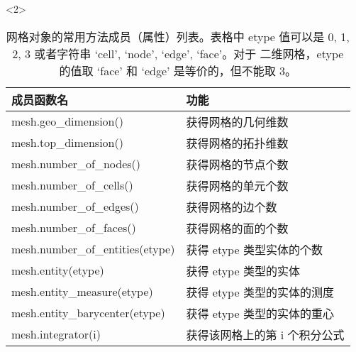 \documentclass{beamer}
\numberwithin{subsection}{section}
\begin{document}
\begin{frame}
\begin{onlyenv}<2>
    \begin{table}[H]
    \tiny
    \centering
    \begin{tabular}{|l|l|}\hline
        成员函数名 &	功能\\\hline
        mesh.geo\_dimension()&	获得网格的几何维数\\\hline
        mesh.top\_dimension()&	获得网格的拓扑维数\\\hline
        mesh.number\_of\_nodes()&	获得网格的节点个数\\\hline
        mesh.number\_of\_cells()&	获得网格的单元个数\\\hline
        mesh.number\_of\_edges()&	获得网格的边个数\\\hline
        mesh.number\_of\_faces()&	获得网格的面的个数\\\hline
        mesh.number\_of\_entities(etype)&	获得 etype 类型实体的个数\\\hline
        mesh.entity(etype)&	获得 etype 类型的实体\\\hline
        mesh.entity\_measure(etype)	& 获得 etype 类型的实体的测度\\\hline
        mesh.entity\_barycenter(etype)&	获得 etype 类型的实体的重心\\\hline
        mesh.integrator(i)&	获得该网格上的第 i 个积分公式\\\hline
    \end{tabular}
    \caption{网格对象的常用方法成员（属性）列表。表格中 etype 值可以是 0, 1, 2, 3 或者字符串 ‘cell’, ‘node’, ‘edge’, ‘face’。对于
二维网格，etype 的值取 ‘face’ 和 ‘edge’ 是等价的，但不能取 3。}\label{tab:fun}
\end{table}
\end{onlyenv}


\end{frame}
\end{document}
